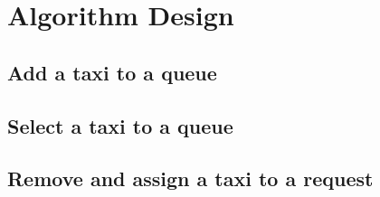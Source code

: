 \section{Algorithm Design}
\subsection{Add a taxi to a queue}
\subsection{Select a taxi to a queue}
\subsection{Remove and assign a taxi to a request}